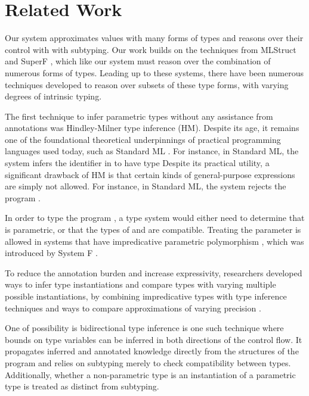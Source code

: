 \documentclass[table,dvipsnames,acmsmall]{acmart}
\theoremstyle{definition}
\begin{document}
\section{Related Work}
\label{sec:related_work}

Our system approximates values with many forms of types
and reasons over their control with with subtyping. Our work
builds on the techniques from MLStruct \cite{} and SuperF \cite{}, which
like our system must reason over the combination of numerous forms of types.
Leading up to these systems, there have been numerous techniques developed
to reason over subsets of these type forms, with varying degrees 
of intrinsic typing. 


The first technique to infer parametric types without any assistance 
from annotations was Hindley-Milner type inference (HM)\cite{}. 
Despite its age, it remains one of the foundational 
theoretical underpinnings of practical programming languages used today, such as Standard ML \cite{}. 
For instance, in Standard ML, the system infers the identifier  in 
to have type 
Despite its practical utility, a significant drawback of HM is that
certain kinds of general-purpose expressions are simply not allowed.
For instance, in Standard ML, the system rejects the program .

In order to type the program , a type system would either need to determine that
 is parametric, or that the types of  and  are compatible.
Treating the parameter  is allowed in systems that have impredicative parametric polymorphism \cite{}, 
which was introduced by System F \cite{}.


To reduce the annotation burden and increase expressivity, researchers
developed ways to infer type instantiations and compare types with varying
multiple possible instantiations, by combining impredicative types
with type inference techniques and ways to compare approximations of varying precision . 

One of possibility is bidirectional type inference \cite{}  
is one such technique where bounds on type variables can be inferred in 
both directions of the control flow.
It propagates inferred and annotated knowledge directly from
the structures of the program and relies on subtyping merely to check compatibility between
types. Additionally, whether a non-parametric type is an instantiation
of a parametric type is treated as distinct from subtyping. 
\end{document}

